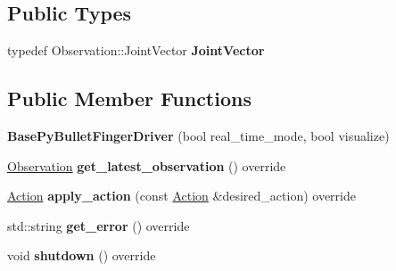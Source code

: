 \subsection*{Public Types}
\begin{DoxyCompactItemize}
\item 
\mbox{\label{classtrifinger__simulation_1_1BasePyBulletFingerDriver_a4d13936a1864dc4d9d732c30a28aa18a}} 
typedef Observation\+::\+Joint\+Vector {\bfseries Joint\+Vector}
\end{DoxyCompactItemize}
\subsection*{Public Member Functions}
\begin{DoxyCompactItemize}
\item 
\mbox{\label{classtrifinger__simulation_1_1BasePyBulletFingerDriver_ad02a0a6e1149723aa334015b94b39137}} 
{\bfseries Base\+Py\+Bullet\+Finger\+Driver} (bool real\+\_\+time\+\_\+mode, bool visualize)
\item 
\mbox{\label{classtrifinger__simulation_1_1BasePyBulletFingerDriver_a3d0356f581f079ef8e3913c88bb9eef0}} 
\hyperlink{classtrifinger__simulation_1_1observation_1_1Observation}{Observation} {\bfseries get\+\_\+latest\+\_\+observation} () override
\item 
\mbox{\label{classtrifinger__simulation_1_1BasePyBulletFingerDriver_a5b24dfe1f7f2d9ecc3508f8e27cbe3d5}} 
\hyperlink{classtrifinger__simulation_1_1action_1_1Action}{Action} {\bfseries apply\+\_\+action} (const \hyperlink{classtrifinger__simulation_1_1action_1_1Action}{Action} \&desired\+\_\+action) override
\item 
\mbox{\label{classtrifinger__simulation_1_1BasePyBulletFingerDriver_a704ff78ce106795581e8d616a863d896}} 
std\+::string {\bfseries get\+\_\+error} () override
\item 
\mbox{\label{classtrifinger__simulation_1_1BasePyBulletFingerDriver_a0184d28dcb227aa508ef563e3fbe192d}} 
void {\bfseries shutdown} () override
\end{DoxyCompactItemize}
